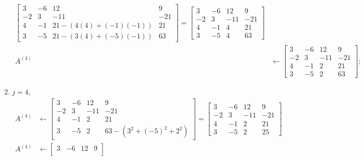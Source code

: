 \begin{questions}
\begin{solution}
\begin{enumerate}
\begin{align*}
\begin{bmatrix}
                        3 & -6 & 12 & 9 \\
                        -2 & 3 & -11 & -21 \\
                        4 & -1 & 21 - (4(4) + (-1)(-1))  & 21 \\
                        3 & -5 & 21 - (3(4) + (-5)(-1)) & 63
                    \end{bmatrix} = \begin{bmatrix}
                        3 & -6 & 12 & 9 \\
                        -2 & 3 & -11 & -21 \\
                        4 & -1 & 4  & 21 \\
                        3 & -5 & 4 & 63
                    \end{bmatrix} \\
                    A^{(3)} &\leftarrow \begin{bmatrix}
                        3 & -6 & 12 & 9 \\
                        -2 & 3 & -11 & -21 \\
                        4 & -1 & 2  & 21 \\
                        3 & -5 & 2 & 63
                    \end{bmatrix};
               \end{align*}
           \item $j = 4$,
               \begin{align*}
                   A^{(4)} &\leftarrow \begin{bmatrix}
                        3 & -6 & 12 & 9 \\
                        -2 & 3 & -11 & -21 \\
                        4 & -1 & 2  & 21 \\
                        3 & -5 & 2 & 63 - (3^2 + (-5)^2 + 2^2)
                    \end{bmatrix} = \begin{bmatrix}
                        3 & -6 & 12 & 9 \\
                        -2 & 3 & -11 & -21 \\
                        4 & -1 & 2  & 21 \\
                        3 & -5 & 2 & 25
                    \end{bmatrix} \\
                    A^{(4)} &\leftarrow \begin{bmatrix}
                        3 & -6 & 12 & 9 \\

\end{bmatrix}
\end{align*}
\end{enumerate}
\end{solution}
\end{questions}
